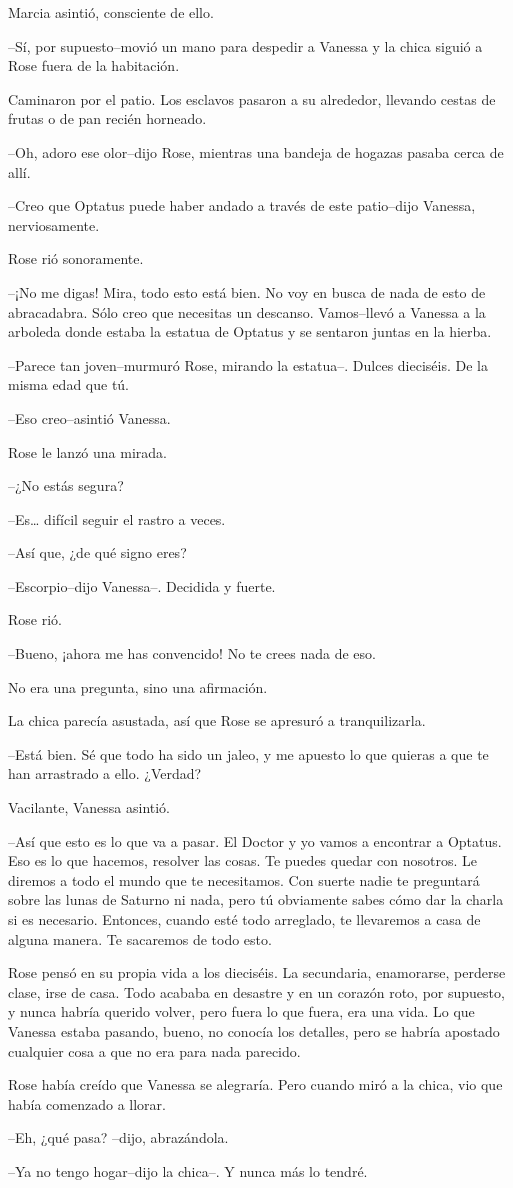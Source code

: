 Marcia asintió, consciente de ello.

--Sí, por supuesto--movió un mano para despedir a Vanessa y la chica
siguió a Rose fuera de la habitación.

Caminaron por el patio. Los esclavos pasaron a su alrededor, llevando
cestas de frutas o de pan recién horneado.

--Oh, adoro ese olor--dijo Rose, mientras una bandeja de hogazas pasaba
cerca de allí.

--Creo que Optatus puede haber andado a través de este patio--dijo
Vanessa, nerviosamente.

Rose rió sonoramente.

--¡No me digas! Mira, todo esto está bien. No voy en busca de nada de
esto de abracadabra. Sólo creo que necesitas un descanso. Vamos--llevó a
Vanessa a la arboleda donde estaba la estatua de Optatus y se sentaron
juntas en la hierba.

--Parece tan joven--murmuró Rose, mirando la estatua--. Dulces
dieciséis. De la misma edad que tú.

--Eso creo--asintió Vanessa.

Rose le lanzó una mirada.

--¿No estás segura?

--Es\ldots{} difícil seguir el rastro a veces.

--Así que, ¿de qué signo eres?

--Escorpio--dijo Vanessa--. Decidida y fuerte.

Rose rió.

--Bueno, ¡ahora me has convencido! No te crees nada de eso.

No era una pregunta, sino una afirmación.

La chica parecía asustada, así que Rose se apresuró a tranquilizarla.

--Está bien. Sé que todo ha sido un jaleo, y me apuesto lo que quieras a
que te han arrastrado a ello. ¿Verdad?

Vacilante, Vanessa asintió.

--Así que esto es lo que va a pasar. El Doctor y yo vamos a encontrar a
Optatus. Eso es lo que hacemos, resolver las cosas. Te puedes quedar con
nosotros. Le diremos a todo el mundo que te necesitamos. Con suerte
nadie te preguntará sobre las lunas de Saturno ni nada, pero tú
obviamente sabes cómo dar la charla si es necesario. Entonces, cuando
esté todo arreglado, te llevaremos a casa de alguna manera. Te sacaremos
de todo esto.

Rose pensó en su propia vida a los dieciséis. La secundaria, enamorarse,
perderse clase, irse de casa. Todo acababa en desastre y en un corazón
roto, por supuesto, y nunca habría querido volver, pero fuera lo que
fuera, era una vida. Lo que Vanessa estaba pasando, bueno, no conocía
los detalles, pero se habría apostado cualquier cosa a que no era para
nada parecido.

Rose había creído que Vanessa se alegraría. Pero cuando miró a la chica,
vio que había comenzado a llorar.

--Eh, ¿qué pasa? --dijo, abrazándola.

--Ya no tengo hogar--dijo la chica--. Y nunca más lo tendré.
